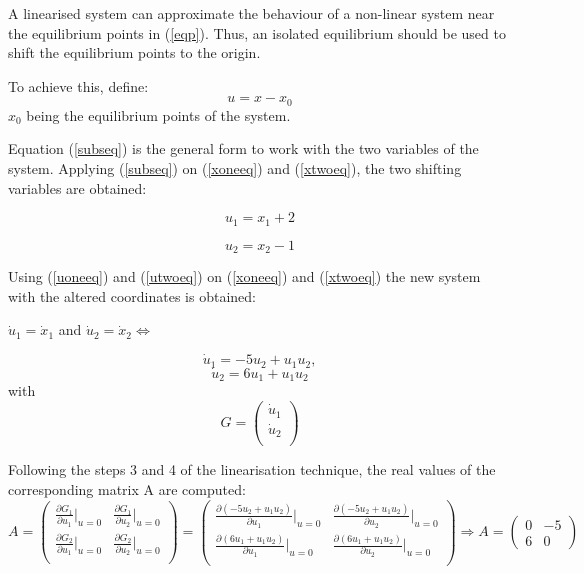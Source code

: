 A linearised system can approximate the behaviour of a non-linear system near the equilibrium points in (\ref{eqp}). Thus, an isolated equilibrium should be used to shift the equilibrium points to the origin.

To achieve this, define:
\begin{equation}
\label{subseq}
u = x - x_0
\end{equation}
$ x_0 $ being the equilibrium points of the system.

Equation (\ref{subseq}) is the general form to work with the two variables of the system. Applying (\ref{subseq}) on (\ref{xoneeq}) and (\ref{xtwoeq}), the two shifting variables are obtained:

\begin{equation}
\label{uoneeq}
u_1 = x_1 + 2
\end{equation}

\begin{equation}
\label{utwoeq}
u_2 = x_2 - 1
\end{equation}


Using (\ref{uoneeq}) and (\ref{utwoeq}) 
on (\ref{xoneeq}) and (\ref{xtwoeq}) 
the new system with the altered coordinates is obtained:

\begin{center}
$ \dot{u}_1 = \dot{x}_1 $ and $ \dot{u}_2 = \dot{x}_2 \iff $
\end{center}
$$ \dot{u}_1 = -5u_2 + u_1u_2, $$
$$ \dot{u}_2 = 6u_1 + u_1u_2 $$
with
$$
G=\begin{pmatrix}
\dot{u}_1 \\
\dot{u}_2 \\
\end{pmatrix}
$$


Following the steps 3 and 4 of the linearisation technique, the real values of the corresponding matrix A are computed:
$$ A=\begin{pmatrix}
     \frac{\partial G_1}{\partial u_1}|_{u=0} & \frac{\partial G_1}{\partial u_2}|_{u=0} \\
    \frac{\partial G_2}{\partial u_1}|_{u=0} & \frac{\partial G_2}{\partial u_2}|_{u=0} \\
    \end{pmatrix} =
\begin{pmatrix}
     \frac{\partial (-5u_2+u_1u_2)}{\partial u_1}|_{u=0} & \frac{\partial (-5u_2 + u_1u_2)}{\partial u_2}|_{u=0} \\
    \frac{\partial (6u_1 + u_1u_2)}{\partial u_1}|_{u=0} & \frac{\partial (6u_1 + u_1u_2)}{\partial u_2}|_{u=0} \\
    \end{pmatrix} \Rightarrow
A=\begin{pmatrix}
0 & -5 \\
6 & 0
\end{pmatrix} 
$$

